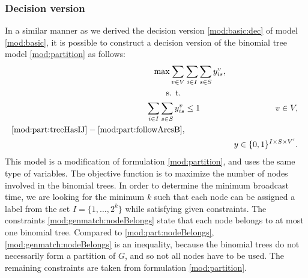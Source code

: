 \subsubsection{Decision version}

In a similar manner as we derived the decision version \eqref{mod:basic:dec} of model \eqref{mod:basic}, it is possible to construct a decision version of the binomial tree model \eqref{mod:partition} as follows:
\begin{subequations}\label{mod:genmatch}
\begin{align}
\notag \max\sum\limits_{v\in V}&\sum\limits_{i\in I}\sum\limits_{s\in S}   y_{is}^v,\\
\notag \text{s. t. } \\
\label{mod:genmatch:nodeBelongs} \sum\limits_{i\in I}\sum\limits_{s\in S}y^v_{is} & \leq 1 & v\in V,\\
\notag\eqref{mod:part:treeHasIJ} - \eqref{mod:part:followArcsB},\\
\label{mod:genmatch:dim}&&y \in \{0,1\}^{I\times S\times V'}.
\end{align}~
\end{subequations}
This model is a modification of formulation \eqref{mod:partition}, and uses the same type of variables.
The objective function is to maximize the number of nodes involved in the binomial trees.
In order to determine the minimum broadcast time, we are looking for the minimum $k$ such that each node can be assigned a label from the set $I=\{1,\dots,2^k\}$ while satisfying given constraints.
The constraints \eqref{mod:genmatch:nodeBelongs} state that each node belongs to at most one binomial tree.
Compared to \eqref{mod:part:nodeBelongs}, \eqref{mod:genmatch:nodeBelongs} is an inequality, because the binomial trees do not necessarily form a partition of $G$, and so not all nodes have to be used.
The remaining constraints are taken from formulation \eqref{mod:partition}.

